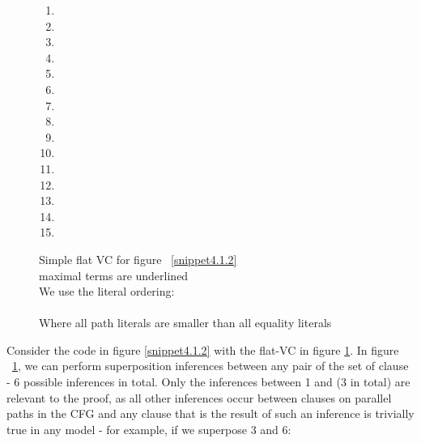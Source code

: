 \begin{figure}
\begin{enumerate}
	\item {}
\bigskip
	\item {}
	\item {}
\bigskip
	\item {}
\bigskip
	\item {}
	\item {}
\bigskip
	\item {}
	\item {}
\bigskip
	\item {}
\bigskip
	\item {}
	\item {}
	\item {}
	\item {}
	\item {}
	\item {}
\end{enumerate}
\caption{Simple flat VC for figure ~\ref{snippet4.1.2}\\
maximal terms are underlined \\
We use the literal ordering:\\
\\
Where all path literals are smaller than all equality literals
}
\label{snippet4.1.2_flatvc}
\end{figure}

\noindent

Consider the code in figure \ref{snippet4.1.2} with the flat-VC in figure \ref{snippet4.1.2_flatvc}. In figure ~\ref{snippet4.1.2_flatvc}, we can perform superposition inferences between any pair of the set of clause  - 6 possible inferences in total.
Only the inferences between 1 and  (3 in total) are relevant to the proof, as all other inferences occur between clauses on parallel paths in the CFG and any clause that is the result of such an inference is trivially true in any model - for example,
if we superpose 3 and 6:

